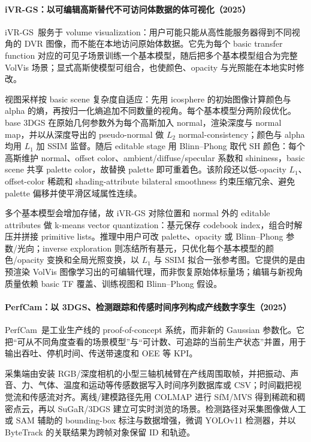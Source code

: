 \paragraph{iVR-GS：以可编辑高斯替代不可访问体数据的体可视化（2025）\cite{2504_17954}}
iVR-GS~\cite{2504_17954}服务于 volume visualization：用户可能只能从高性能服务器得到不同视角的 DVR 图像，而不能在本地访问原始体数据。它先为每个 basic transfer function 对应的可见子场景训练一个基本模型，随后把多个基本模型组合为完整 VolVis 场景；显式高斯使模型可组合，也使颜色、opacity 与光照能在本地实时修改。

视图采样按 basic scene 复杂度自适应：先用 icosphere 的初始图像计算颜色与 alpha 的熵，再按归一化熵追加不同数量的视角。每个基本模型分两阶段优化。base 3DGS 在原始几何参数外为每个高斯加入 normal，渲染深度与 normal map，并以从深度导出的 pseudo-normal 做 $L_2$ normal-consistency；颜色与 alpha 均用 $L_1$ 加 SSIM 监督。随后 editable stage 用 Blinn--Phong 取代 SH 颜色：每个高斯维护 normal、offset color、ambient/diffuse/specular 系数和 shininess，basic scene 共享 palette color，故替换 palette 即可重着色。该阶段还以低-opacity $L_1$、offset-color 稀疏和 shading-attribute bilateral smoothness 约束压缩冗余、避免 palette 偏移并使平滑区域属性连续。

多个基本模型会增加存储，故 iVR-GS 对除位置和 normal 外的 editable attributes 做 k-means vector quantization：基元保存 codebook index，组合时解压并拼接 primitive lists。推理中用户可改 palette、opacity 或 Blinn--Phong 参数/光向；inverse exploration 则冻结所有基元，只优化每个基本模型的颜色/opacity 变换和全局光照变换，以 $L_1$ 与 SSIM 拟合一张参考图。它提供的是由预渲染 VolVis 图像学习出的可编辑代理，而非恢复原始体标量场；编辑与新视角质量依赖 basic TF 覆盖、训练视图和 Blinn--Phong 假设。

\paragraph{PerfCam：以 3DGS、检测跟踪和传感时间序列构成产线数字孪生（2025）\cite{2504_18165}}
PerfCam~\cite{2504_18165}是工业生产线的 proof-of-concept 系统，而非新的 Gaussian 参数化。它把“可从不同角度查看的场景模型”与“可计数、可追踪的当前生产状态”并置，用于输出吞吐、停机时间、传送带速度和 OEE 等 KPI。

采集端由安装 RGB/深度相机的小型三轴机械臂在产线周围取帧，并把振动、声音、力、气体、温度和运动等传感数据写入时间序列数据库或 CSV；时间戳把视觉流和传感流对齐。离线/建模路径先用 COLMAP 进行 SfM/MVS 得到稀疏和稠密点云，再以 SuGaR/3DGS 建立可实时浏览的场景。检测路径对采集图像做人工或 SAM 辅助的 bounding-box 标注与数据增强，微调 YOLOv11 检测器，并以 ByteTrack 的关联结果为跨帧对象保留 ID 和轨迹。

